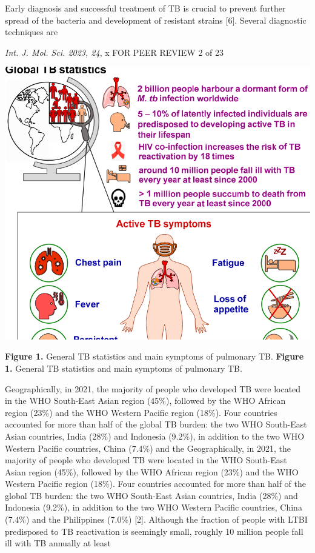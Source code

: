 \documentclass{article}
\begin{document}
Early diagnosis and successful treatment of TB is crucial to prevent further spread of the bacteria and development of resistant strains [6]. Several diagnostic techniques are

\textit{Int. J. Mol. Sci. 2023, 24}, x FOR PEER REVIEW 2 of 23


\includegraphics{_page_1_Figure_2.png}


\textbf{Figure 1.} General TB statistics and main symptoms of pulmonary TB. \textbf{Figure 1.} General TB statistics and main symptoms of pulmonary TB.

Geographically, in 2021, the majority of people who developed TB were located in the WHO South-East Asian region (45\%), followed by the WHO African region (23\%) and the WHO Western Pacific region (18\%). Four countries accounted for more than half of the global TB burden: the two WHO South-East Asian countries, India (28\%) and Indonesia (9.2\%), in addition to the two WHO Western Pacific countries, China (7.4\%) and the Geographically, in 2021, the majority of people who developed TB were located in the WHO South-East Asian region (45\%), followed by the WHO African region (23\%) and the WHO Western Pacific region (18\%). Four countries accounted for more than half of the global TB burden: the two WHO South-East Asian countries, India (28\%) and Indonesia (9.2\%), in addition to the two WHO Western Pacific countries, China (7.4\%) and the Philippines (7.0\%) [2]. Although the fraction of people with LTBI predisposed to TB reactivation is seemingly small, roughly 10 million people fall ill with TB annually at least
\end{document}

